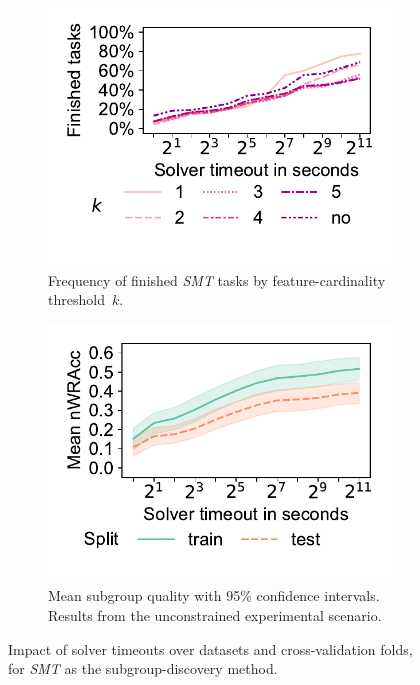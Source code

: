 \documentclass{article}
\theoremstyle{definition}
\begin{document}
\begin{figure}[t]
	\centering
	\begin{subfigure}[t]{0.48\textwidth}
		\centering
		\includegraphics[width=\textwidth, trim=15 25 15 10, clip]{plots/csd-timeouts-finished-tasks.pdf}
		\caption{
			Frequency of finished \emph{SMT} tasks by feature-cardinality threshold~$k$.
		}
		\label{fig:csd:timeouts-finished-tasks}
	\end{subfigure}
	\hfill
	\begin{subfigure}[t]{0.48\textwidth}
		\centering
		\includegraphics[width=\textwidth, trim=15 25 15 10, clip]{plots/csd-timeouts-nwracc.pdf}
		\caption{
			Mean subgroup quality with 95\% confidence intervals.
			Results from the unconstrained experimental scenario.
		}
		\label{fig:csd:timeouts-nwracc}
	\end{subfigure}
	\caption{
		Impact of solver timeouts over datasets and cross-validation folds, for \emph{SMT} as the subgroup-discovery method.
	}
	\label{fig:csd:timeouts}
\end{figure}
\end{document}
